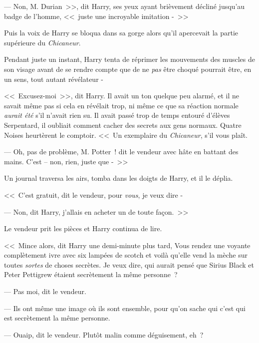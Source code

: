 --- Non, M. Durian~>>, dit Harry, ses yeux ayant brièvement décliné jusqu'au badge de l'homme, <<~juste une incroyable imitation -~>>

Puis la voix de Harry se bloqua dans sa gorge alors qu'il apercevait la partie supérieure du \emph{Chicaneur}.

Pendant juste un instant, Harry tenta de réprimer les mouvements des muscles de son visage avant de se rendre compte que de ne \emph{pas} être choqué pourrait être, en un sens, tout autant révélateur -

<<~Excusez-moi~>>, dit Harry. Il avait un ton quelque peu alarmé, et il ne savait même pas si cela en révélait trop, ni même ce que sa réaction normale \emph{aurait été} s'il n'avait rien su. Il avait passé trop de temps entouré d'élèves Serpentard, il oubliait comment cacher des secrets aux gens normaux. Quatre Noises heurtèrent le comptoir. <<~Un exemplaire du \emph{Chicaneur}, s'il vous plaît.

--- Oh, pas de problème, M. Potter~! dit le vendeur avec hâte en battant des mains. C'est -- non, rien, juste que -~>>

Un journal traversa les airs, tomba dans les doigts de Harry, et il le déplia.


<<~C'est gratuit, dit le vendeur, pour \emph{vous}, je veux dire -

--- Non, dit Harry, j'allais en acheter un de toute façon.~>>

Le vendeur prit les pièces et Harry continua de lire.

<<~Mince alors, dit Harry une demi-minute plus tard, Vous rendez une voyante complètement ivre avec six lampées de scotch et voilà qu'elle vend la mèche sur toutes \emph{sortes} de choses secrètes. Je veux dire, qui aurait pensé que Sirius Black et Peter Pettigrew étaient secrètement la même personne~?

--- Pas moi, dit le vendeur.

--- Ils ont même une image où ils sont ensemble, pour qu'on sache qui c'est qui est secrètement la même personne.

--- Ouaip, dit le vendeur. Plutôt malin comme déguisement, eh~?

